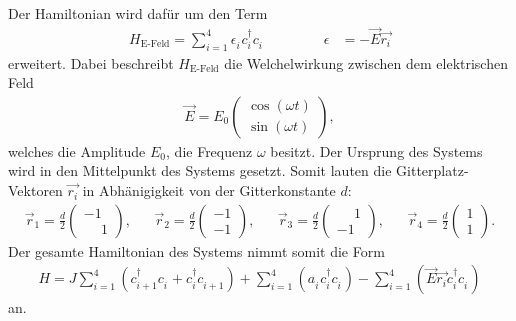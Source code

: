 Der Hamiltonian wird dafür um den Term
\begin{align}
  H_\text{E-Feld}=\sum_{i=1}^4 \epsilon_i^{\phantom{\dag}} c_i^\dag c_i^{\phantom{\dag}}  \,\,   \quad \quad  \,\, & &\epsilon&=-\vec{E} \vec{r_i}
\end{align}
erweitert. Dabei beschreibt $H_\text{E-Feld}$ die Welchelwirkung zwischen dem elektrischen Feld
\begin{align}
  \vec E=E_0\begin{pmatrix}
\cos\left(\omega t\right)\\
\sin\left(\omega t\right)
 \end{pmatrix},
\end{align}
welches die Amplitude $E_0$, die Frequenz $\omega$ besitzt.
Der Ursprung des Systems wird in den Mittelpunkt des Systems gesetzt.
Somit lauten die Gitterplatz-Vektoren $\vec{r_i}$ in Abhänigigkeit von der Gitterkonstante $d$:
\begin{align}
  \vec{r}_1=\frac{d}{2}\begin{pmatrix}-1  \\ \phantom{-}1 \end{pmatrix},& &
  \vec{r}_2=\frac{d}{2}\begin{pmatrix}-1  \\ -1 \end{pmatrix},& &
  \vec{r}_3=\frac{d}{2}\begin{pmatrix}\phantom{-}1  \\ -1 \end{pmatrix},& &
  \vec{r}_4=\frac{d}{2}\begin{pmatrix}1  \\ 1 \end{pmatrix}.
\end{align}
Der gesamte Hamiltonian des Systems nimmt somit die Form
\begin{align}
H=J\sum_{i=1}^4 \left(c_{i+1}^\dag c_i^{\phantom{\dag}} + c_{i}^\dag c_{i+1}^{\phantom{\dag}}\right)
+\sum_{i=1}^4 \left(a_i^{\phantom{\dag}} c_i^\dag c_i^{\phantom{\dag}}\right)
-\sum_{i=1}^4 \left(\vec{E} \vec{r_i}  c_i^\dag c_i^{\phantom{\dag}}\right)
\end{align}
an.


